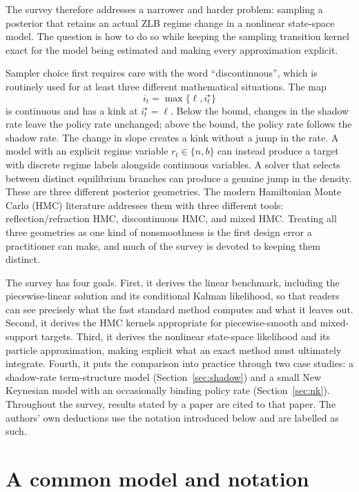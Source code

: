 \documentclass[11pt]{article}
\begin{document}
The survey therefore addresses a narrower and harder problem: sampling a posterior that retains an actual ZLB regime change in a nonlinear state-space model. The question is how to do so while keeping the sampling transition kernel exact for the model being estimated and making every approximation explicit.

Sampler choice first requires care with the word ``discontinuous'', which is routinely used for at least three different mathematical situations. The map
\[
 i_t=\max\{\ell,i_t^\star\}
\]
is continuous and has a kink at \(i_t^\star=\ell\). Below the bound, changes in the shadow rate leave the policy rate unchanged; above the bound, the policy rate follows the shadow rate. The change in slope creates a kink without a jump in the rate. A model with an explicit regime variable \(r_t\in\{n,b\}\) can instead produce a target with discrete regime labels alongside continuous variables. A solver that selects between distinct equilibrium branches can produce a genuine jump in the density. These are three different posterior geometries. The modern Hamiltonian Monte Carlo (HMC) literature addresses them with three different tools: reflection/refraction HMC, discontinuous HMC, and mixed HMC. Treating all three geometries as one kind of nonsmoothness is the first design error a practitioner can make, and much of the survey is devoted to keeping them distinct.

The survey has four goals. First, it derives the linear benchmark, including the piecewise-linear solution and its conditional Kalman likelihood, so that readers can see precisely what the fast standard method computes and what it leaves out. Second, it derives the HMC kernels appropriate for piecewise-smooth and mixed-support targets. Third, it derives the nonlinear state-space likelihood and its particle approximation, making explicit what an exact method must ultimately integrate. Fourth, it puts the comparison into practice through two case studies: a shadow-rate term-structure model (Section~\ref{sec:shadow}) and a small New Keynesian model with an occasionally binding policy rate (Section~\ref{sec:nk}). Throughout the survey, results stated by a paper are cited to that paper. The authors' own deductions use the notation introduced below and are labelled as such.

\section{A common model and notation}\label{sec:model}
\end{document}
